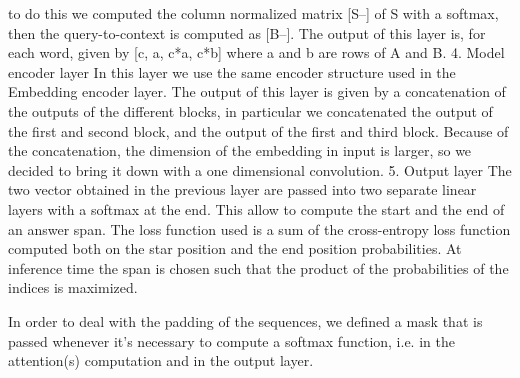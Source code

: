 to do this we computed the column normalized matrix [S--] of S with a softmax, then the query-to-context is computed as [B--].
The output of this layer is, for each word, given by [c, a, c*a, c*b] where a and b are rows of A and B. 
4. Model encoder layer
In this layer we use the same encoder structure used in the Embedding encoder layer. The output of this layer is given by a concatenation of the outputs of the different blocks, in particular we concatenated
the output of the first and second block, and the output of the first and third block. Because of the concatenation, the dimension of the embedding in input is larger, so we decided to bring it down with a one
dimensional convolution.
5. Output layer
The two vector obtained in the previous layer are passed into two separate linear layers with a softmax at the end. This allow to compute the start and the end of an answer span. The loss function used
is a sum of the cross-entropy loss function computed both on the star position and the end position probabilities.
At inference time the span is chosen such that the product of the probabilities of the indices is maximized.

In order to deal with the padding of the sequences, we defined a mask that is passed whenever it's necessary to compute a softmax function, i.e. in the attention(s) computation and in the output layer.